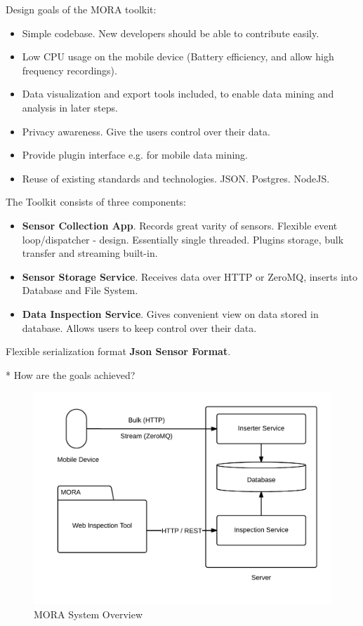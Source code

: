 \documentclass[times, 10pt,twocolumn]{article}
\begin{document}
Design goals of the MORA toolkit:
\begin{itemize}
\item Simple codebase. New developers should be able to contribute easily.
\item Low CPU usage on the mobile device (Battery efficiency, and allow high frequency recordings).
\item Data visualization and export tools included, to enable data mining and analysis in later steps.
\item Privacy awareness. Give the users control over their data.
\item Provide plugin interface e.g. for mobile data mining.
\item Reuse of existing standards and technologies. JSON. Postgres. NodeJS.
\end{itemize}

The Toolkit consists of three components:
\begin{itemize}
\item \textbf{Sensor Collection App}.  Records great varity of
  sensors. Flexible event loop/dispatcher - design. Essentially single
  threaded. Plugins storage, bulk transfer and streaming built-in.
\item \textbf{Sensor Storage Service}.
  Receives data over HTTP or ZeroMQ, inserts into Database and File System.
\item \textbf{Data Inspection Service}.  Gives convenient view on data
  stored in database. Allows users to keep control over their data.
\end{itemize}

Flexible serialization format {\bf Json Sensor Format}.

* How are the goals achieved?

\begin{figure}[h]
\includegraphics[width=\linewidth]{img/system_overview.png}
\caption{MORA System Overview}
\label{overview}
\end{figure}
\end{document}

